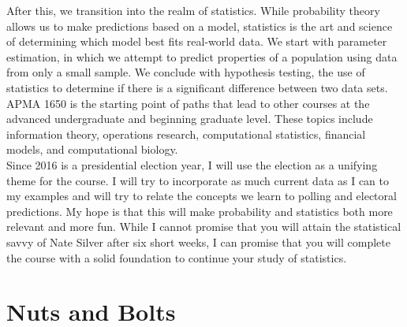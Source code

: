 \documentclass[11pt]{article}
\begin{document}
After this, we transition into the realm of statistics. While probability theory allows us to make predictions based on a model, statistics is the art and science of determining which model best fits real-world data. We start with parameter estimation, in which we attempt to predict properties of a population using data from only a small sample. We conclude with hypothesis testing,  the use of statistics to determine if there is a significant difference between two data sets.\\
 
APMA 1650 is the starting point of paths that lead to other courses at the advanced undergraduate and beginning graduate level. These topics include information theory, operations research, computational statistics, financial models, and computational biology. \\

Since 2016 is a presidential election year, I will use the election as a unifying theme for the course. I will try to incorporate as much current data as I can to my examples and will try to relate the concepts we learn to polling and electoral predictions. My hope is that this will make probability and statistics both more relevant and more fun. While I cannot promise that you will attain the statistical savvy of Nate Silver after six short weeks, I can promise that you will complete the course with a solid foundation to continue your study of statistics.


\section*{Nuts and Bolts}
\end{document}
